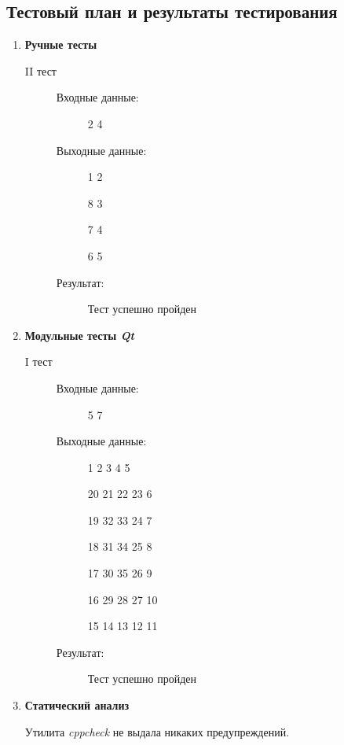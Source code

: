 \documentclass[12pt,a4paper]{report}
\begin{document}
\subsection{Тестовый план и результаты тестирования}
\begin{enumerate}
\item \textbf{Ручные тесты}

\begin{description}
\item[II тест]
\hspace{\parindent}
\begin{flushleft}
\begin{description}
\item[Входные данные:] 2 4
\item[Выходные данные:]
\hspace{\parindent}
\begin{flushleft}
 1  2 
 
 8  3
 
 7  4
 
 6  5
\end{flushleft}
\item[Результат:] Тест успешно пройден
\end{description}
\end{flushleft}
\end{description}

\item \textbf{Модульные тесты \textit{Qt}}

\begin{description}
\item[I тест]
\hspace{\parindent}
\begin{flushleft}
\begin{description}
\item[Входные данные:] 5 7
\item[Выходные данные:]
\hspace{\parindent}
\begin{flushleft}
 1  2  3  4  5 

20 21 22 23  6

19 32 33 24  7

18 31 34 25  8

17 30 35 26  9

16 29 28 27 10

15 14 13 12 11
\end{flushleft}
\item[Результат:] Тест успешно пройден
\end{description}
\end{flushleft}
\end{description}


\item \textbf{Статический анализ}

\hspace{\parindent} Утилита \textit{cppcheck} не выдала никаких предупреждений.

\end{enumerate}
\end{document}
